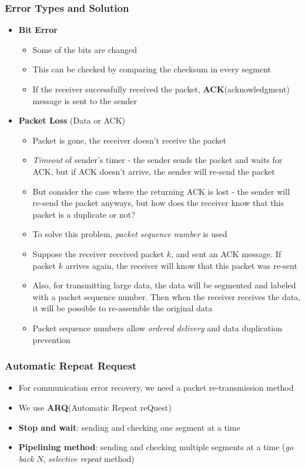 \subsubsection{Error Types and Solution}
\begin{itemize}
	\item \textbf{Bit Error}
	\begin{itemize}
		\item Some of the bits are changed
		\item This can be checked by comparing the checksum in every segment
		\item If the receiver successfully received the packet, \textbf{ACK}(acknowledgment) message is sent to the sender
	\end{itemize}
	\item \textbf{Packet Loss} (Data or ACK)
	\begin{itemize}
		\item Packet is gone, the receiver doesn't receive the packet
		\item \textit{Timeout} of sender's timer - the sender sends the packet and waits for ACK, but if ACK doesn't arrive, the sender will re-send the packet
		\item But consider the case where the returning ACK is lost - the sender will re-send the packet anyways, but how does the receiver know that this packet is a duplicate or not?
		\item To solve this problem, \textit{packet sequence number} is used
		\item Suppose the receiver received packet $k$, and sent an ACK message. If packet $k$ arrives again, the receiver will know that this packet was re-sent
		\item Also, for transmitting large data, the data will be segmented and labeled with a packet sequence number. Then when the receiver receives the data, it will be possible to re-assemble the original data
		\item Packet sequence numbers allow \textit{ordered delivery} and data duplication prevention
	\end{itemize}
\end{itemize}

\subsubsection{Automatic Repeat Request}
\begin{itemize}
	\item For communication error recovery, we need a packet re-transmission method
	\item We use \textbf{ARQ}(Automatic Repeat reQuest)
	\item \textbf{Stop and wait}: sending and checking one segment at a time
	\item \textbf{Pipelining method}: sending and checking multiple segments at a time (\textit{go back} $N$, \textit{selective repeat} method)
\end{itemize}

